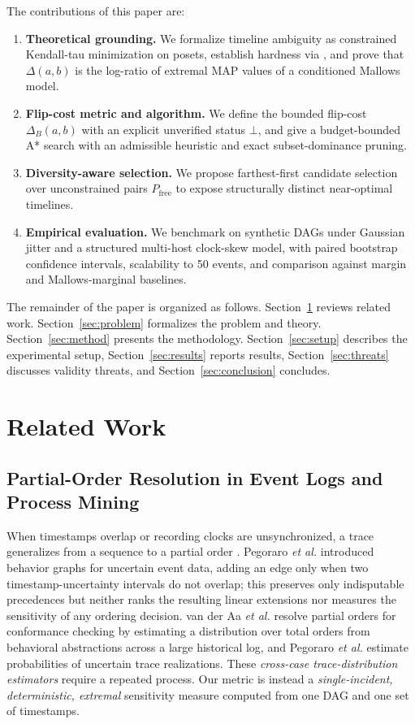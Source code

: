 \documentclass{ieeeaccess}
\newcommand{\Pfree}{P_{\mathrm{free}}}
\begin{document}
The contributions of this paper are:
\begin{enumerate}
\item \textbf{Theoretical grounding.} We formalize timeline ambiguity as constrained Kendall-tau minimization on posets, establish hardness via \cite{Brandenburg2011}, and prove that $\Delta(a,b)$ is the log-ratio of extremal MAP values of a conditioned Mallows model.
\item \textbf{Flip-cost metric and algorithm.} We define the bounded flip-cost $\Delta_B(a,b)$ with an explicit unverified status $\bot$, and give a budget-bounded A* search with an admissible heuristic and exact subset-dominance pruning.
\item \textbf{Diversity-aware selection.} We propose farthest-first candidate selection over unconstrained pairs $\Pfree$ to expose structurally distinct near-optimal timelines.
\item \textbf{Empirical evaluation.} We benchmark on synthetic DAGs under Gaussian jitter and a structured multi-host clock-skew model, with paired bootstrap confidence intervals, scalability to 50 events, and comparison against margin and Mallows-marginal baselines.
\end{enumerate}

The remainder of the paper is organized as follows. Section~\ref{sec:related} reviews related work. Section~\ref{sec:problem} formalizes the problem and theory. Section~\ref{sec:method} presents the methodology. Section~\ref{sec:setup} describes the experimental setup, Section~\ref{sec:results} reports results, Section~\ref{sec:threats} discusses validity threats, and Section~\ref{sec:conclusion} concludes.

\section{Related Work}\label{sec:related}

\subsection{Partial-Order Resolution in Event Logs and Process Mining}
When timestamps overlap or recording clocks are unsynchronized, a trace generalizes from a sequence to a partial order \cite{vanderAa2020,Pegoraro2020a}. Pegoraro \emph{et al.} \cite{Pegoraro2020a,Pegoraro2020b} introduced behavior graphs for uncertain event data, adding an edge only when two timestamp-uncertainty intervals do not overlap; this preserves only indisputable precedences but neither ranks the resulting linear extensions nor measures the sensitivity of any ordering decision. van der Aa \emph{et al.} \cite{vanderAa2020} resolve partial orders for conformance checking by estimating a distribution over total orders from behavioral abstractions across a large historical log, and Pegoraro \emph{et al.} \cite{Pegoraro2021} estimate probabilities of uncertain trace realizations. These \emph{cross-case trace-distribution estimators} require a repeated process. Our metric is instead a \emph{single-incident, deterministic, extremal} sensitivity measure computed from one DAG and one set of timestamps.
\end{document}
